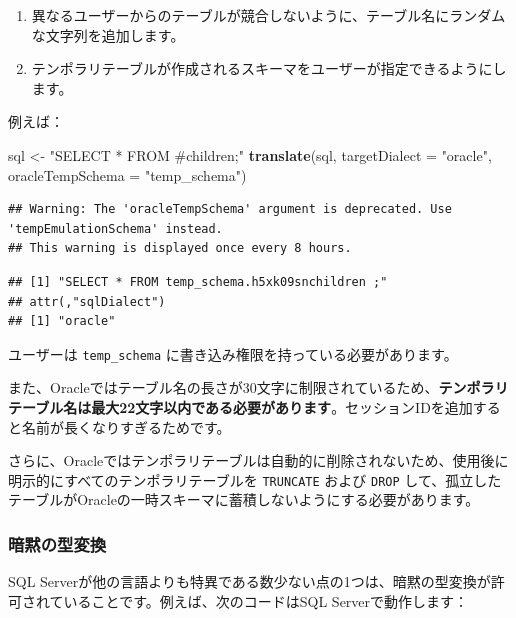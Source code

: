 \documentclass[
  11pt]{book}
\newenvironment{Shaded}{\begin{snugshade}}{\end{snugshade}}
\newcommand{\AttributeTok}[1]{\textcolor[rgb]{0.13,0.29,0.53}{#1}}
\newcommand{\FunctionTok}[1]{\textcolor[rgb]{0.13,0.29,0.53}{\textbf{#1}}}
\newcommand{\NormalTok}[1]{#1}
\newcommand{\OtherTok}[1]{\textcolor[rgb]{0.56,0.35,0.01}{#1}}
\newcommand{\StringTok}[1]{\textcolor[rgb]{0.31,0.60,0.02}{#1}}
\providecommand{\tightlist}{%
  \setlength{\itemsep}{0pt}\setlength{\parskip}{0pt}}
\theoremstyle{definition}
\theoremstyle{definition}
\theoremstyle{definition}
\theoremstyle{definition}
\theoremstyle{remark}
\begin{document}
\begin{enumerate}
\def\labelenumi{\arabic{enumi}.}
\tightlist
\item
  異なるユーザーからのテーブルが競合しないように、テーブル名にランダムな文字列を追加します。
\item
  テンポラリテーブルが作成されるスキーマをユーザーが指定できるようにします。
\end{enumerate}

例えば：

\begin{Shaded}
\begin{Highlighting}[]
\NormalTok{sql }\OtherTok{\textless{}{-}} \StringTok{"SELECT * FROM \#children;"}
\FunctionTok{translate}\NormalTok{(sql, }\AttributeTok{targetDialect =} \StringTok{"oracle"}\NormalTok{, }\AttributeTok{oracleTempSchema =} \StringTok{"temp\_schema"}\NormalTok{)}
\end{Highlighting}
\end{Shaded}

\begin{verbatim}
## Warning: The 'oracleTempSchema' argument is deprecated. Use 'tempEmulationSchema' instead.
## This warning is displayed once every 8 hours.
\end{verbatim}

\begin{verbatim}
## [1] "SELECT * FROM temp_schema.h5xk09snchildren ;"
## attr(,"sqlDialect")
## [1] "oracle"
\end{verbatim}

ユーザーは \texttt{temp\_schema} に書き込み権限を持っている必要があります。

また、Oracleではテーブル名の長さが30文字に制限されているため、\textbf{テンポラリテーブル名は最大22文字以内である必要があります}。セッションIDを追加すると名前が長くなりすぎるためです。

さらに、Oracleではテンポラリテーブルは自動的に削除されないため、使用後に明示的にすべてのテンポラリテーブルを \texttt{TRUNCATE} および \texttt{DROP} して、孤立したテーブルがOracleの一時スキーマに蓄積しないようにする必要があります。

\subsubsection*{暗黙の型変換}\label{ux6697ux9ed9ux306eux578bux5909ux63db}

SQL Serverが他の言語よりも特異である数少ない点の1つは、暗黙の型変換が許可されていることです。例えば、次のコードはSQL Serverで動作します：
\end{document}
